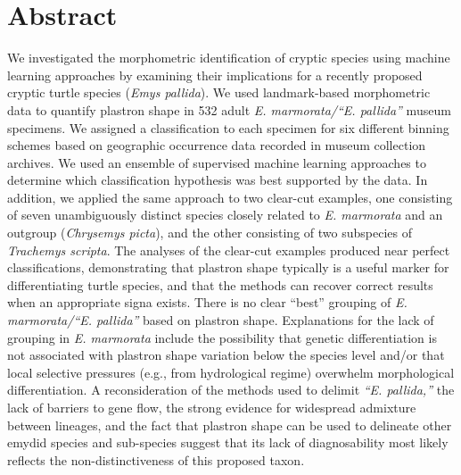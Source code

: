 \documentclass[10pt,letterpaper]{article}
\begin{document}
\section*{Abstract}
  We investigated the morphometric identification of cryptic species using machine learning approaches by examining their implications for a recently proposed cryptic turtle species (\textit{Emys pallida}). We used landmark-based morphometric data to quantify plastron shape in 532 adult \textit{E. marmorata/``E. pallida''} museum specimens. We assigned a classification to each specimen for six different binning schemes based on geographic occurrence data recorded in museum collection archives. We used an ensemble of supervised machine learning approaches to determine which classification hypothesis was best supported by the data. In addition, we applied the same approach to two clear-cut examples, one consisting of seven unambiguously distinct species closely related to \textit{E. marmorata} and an outgroup (\textit{Chrysemys picta}), and the other consisting of two subspecies of \textit{Trachemys scripta}. The analyses of the clear-cut examples produced near perfect classifications, demonstrating that plastron shape typically is a useful marker for differentiating turtle species, and that the methods can recover correct results when an appropriate signa exists. There is no clear ``best'' grouping of \textit{E. marmorata/``E. pallida''} based on plastron shape. Explanations for the lack of grouping in \textit{E. marmorata} include the possibility that genetic differentiation is not associated with plastron shape variation below the species level and/or that local selective pressures (e.g., from hydrological regime) overwhelm morphological differentiation. A reconsideration of the methods used to delimit \textit{``E. pallida,''} the lack of barriers to gene flow, the strong evidence for widespread admixture between lineages, and the fact that plastron shape can be used to delineate other emydid species and sub-species suggest that its lack of diagnosability most likely reflects the non-distinctiveness of this proposed taxon. 



\linenumbers
\end{document}

